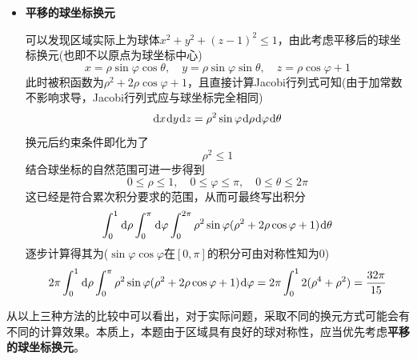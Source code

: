 \documentclass[a4paper,UTF8,fontset=windows,AutoFakeBold]{ctexart}
\newcommand*{\dr}{\hspace{0.07em}\mathrm{d}}
\theoremstyle{ex}
\begin{document}
\begin{framed}
{\begin{itemize}
        \item \textbf{平移的球坐标换元}
        
        可以发现区域实际上为球体$x^2+y^2+(z-1)^2\le1$，由此考虑平移后的球坐标换元(也即不以原点为球坐标中心)
        $$x=\rho\sin\varphi\cos\theta,\quad y=\rho\sin\varphi\sin\theta,\quad z=\rho\cos\varphi+1$$
        此时被积函数为$\rho^2+2\rho\cos\varphi+1$，且直接计算Jacobi行列式可知(由于加常数不影响求导，Jacobi行列式应与球坐标完全相同)
        $$\dr x\dr y\dr z=\rho^2\sin\varphi\dr\rho\dr\varphi\dr\theta$$
        换元后约束条件即化为了
        $$\rho^2\le1$$
        结合球坐标的自然范围可进一步得到
        $$0\le\rho\le1,\quad 0\le\varphi\le\pi,\quad 0\le\theta\le2\pi$$
        这已经是符合累次积分要求的范围，从而可最终写出积分
        $$\int_0^1\dr\rho\int_0^\pi\dr\varphi\int_0^{2\pi}\rho^2\sin\varphi(\rho^2+2\rho\cos\varphi+1)\dr\theta$$
        逐步计算得其为($\sin\varphi\cos\varphi$在$[0,\pi]$的积分可由对称性知为0)
        $$2\pi\int_0^1\dr\rho\int_0^\pi\rho^2\sin\varphi(\rho^2+2\rho\cos\varphi+1)\dr\varphi=2\pi\int_0^12(\rho^4+\rho^2)=\frac{32\pi}{15}$$
    \end{itemize}
}
\end{framed}
从以上三种方法的比较中可以看出，对于实际问题，采取不同的换元方式可能会有不同的计算效果。本质上，本题由于区域具有良好的球对称性，应当优先考虑\textbf{平移的球坐标换元}。
\end{document}
